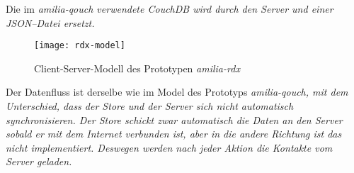 Die im \it{amilia-qouch} verwendete CouchDB wird durch den Server und einer \gls{JSON}--Datei ersetzt.
%
\begin{figure}[H]
  \centering
  \texttt{[image: rdx-model]}
  \grayRule
  \caption{Client-Server-Modell des Prototypen \it{amilia-rdx}}
  \label{fig:rdx-model}
\end{figure}
% 
Der Datenfluss ist derselbe wie im Model des Prototyps \it{amilia-qouch}, mit dem Unterschied, dass der Store und der Server sich nicht automatisch synchronisieren.
Der Store schickt zwar automatisch die Daten an den Server sobald er mit dem Internet verbunden ist, aber in die andere Richtung ist das nicht implementiert.
Deswegen werden nach jeder Aktion die Kontakte vom Server geladen.
